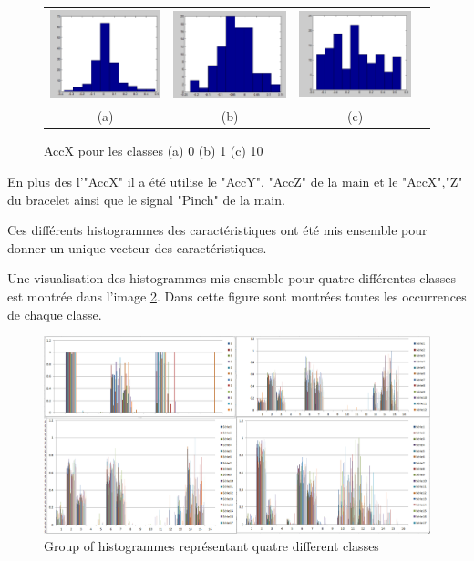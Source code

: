 \begin{figure}[h!]
    \centering
    \begin{tabular}{cccc}
      \includegraphics[width=.30\linewidth]{img/pretraitement/hist0.png} &
      \includegraphics[width=.30\linewidth]{img/pretraitement/hist1.png} &
      \includegraphics[width=.30\linewidth]{img/pretraitement/hist10.png} \\
      (a) & (b) & (c)\\
    \end{tabular}
    \caption{AccX pour les classes (a) 0 (b) 1 (c) 10
    \label{fig:histogram-pre}}
\end{figure}


En plus des l'"AccX" il a été utilise le "AccY", "AccZ" de la main et le "AccX","Z" du bracelet ainsi que le signal "Pinch" de la main.

Ces différents histogrammes  des caractéristiques ont été mis ensemble pour donner un unique vecteur des caractéristiques. 

Une visualisation des histogrammes mis ensemble pour quatre différentes classes est montrée dans l'image \ref{fig:histvector}. Dans cette figure sont montrées toutes les occurrences de chaque classe.

\begin{figure}[h]
  \centering
    \includegraphics[width=1\linewidth]{img/extraction/vector-hist.png}
  \caption{Group of histogrammes représentant quatre different classes}
  \label{fig:histvector}
\end{figure}

